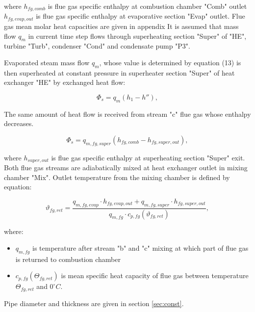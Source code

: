 \documentclass[openany]{book}
\begin{document}
	\noindent
	where 
	$h_{fg,comb}$ is flue gas specific enthalpy at combustion chamber "Comb" 
	outlet
	$h_{fg,evap,out}$ is flue gas specific enthalpy at evaporative section 
	"Evap" outlet.
	Flue gas mean molar heat capacities are given in appendix
	It is assumed that mass flow $q_m$ in current time step flows through 
	superheating section "Super" of "HE", turbine "Turb", condenser "Cond" and 
	condensate pump "P3".
	
	Evaporated steam mass flow $q_m$, whose value is determined by equation 
	(13) is then superheated at constant pressure in superheater section 
	"Super" of heat exchanger "HE" by exchanged heat flow:
	
	\begin{equation}\label{eq:evap_steam_mass3}
	\Phi_s = q_m(h_1 - h''),
	\end{equation}
	
	The same amount of heat flow is received from stream "c" flue gas whose 
	enthalpy decreases.
	
	\begin{equation}\label{eq:evap_steam_mass4}
	\Phi_s = q_{m,fg,super} (h_{fg,comb} - h_{fg,super,out}),
	\end{equation}
	
	\noindent
	where $h_{super,out}$ is flue gas specific enthalpy at superheating section 
	"Super" exit. Both flue gas streams are adiabatically mixed at heat 
	exchanger outlet in mixing chamber "Mix". Outlet temperature from the 
	mixing chamber is defined by equation:
	
	\begin{equation}\label{eq:outlet_temp}
	\vartheta_{fg,ret} = \frac{q_{m,fg,evap} \cdot h_{fg,evap,out} + 
	q_{m,fg,super} \cdot h_{fg,super,out}}{q_{m,fg} \cdot c_{p,fg} 
	(\vartheta_{fg,ret})},
	\end{equation}
	
	\noindent
	where:
	
	\begin{itemize}
		\item $q_{m,fg}$ is temperature after stream "b" and "c" mixing at 
		which part of flue gas is returned to combustion chamber
		\item $c_{p,fg} (\Theta_{fg,ret})$ is mean specific heat capacity of 
		flue gas between temperature $\Theta_{fg,ret}$ and $0^{\circ}C$.
	\end{itemize}
	
	Pipe diameter and thickness are given in section \ref{sec:const}.
	
\end{document}
